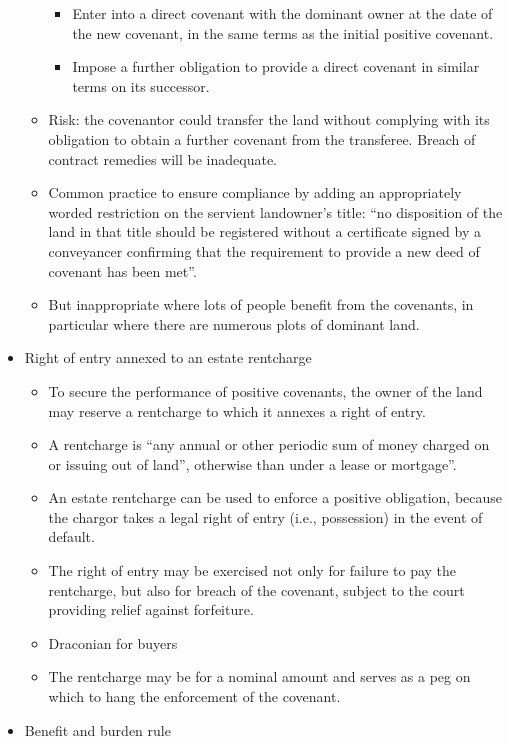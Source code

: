 \documentclass[
]{article}
\providecommand{\tightlist}{%
  \setlength{\itemsep}{0pt}\setlength{\parskip}{0pt}}
\begin{document}
\begin{itemize}
\begin{itemize}
    \begin{itemize}
    \tightlist
    \item
      Enter into a direct covenant with the dominant owner at the date
      of the new covenant, in the same terms as the initial positive
      covenant.
    \item
      Impose a further obligation to provide a direct covenant in
      similar terms on its successor.
    \end{itemize}
  \item
    Risk: the covenantor could transfer the land without complying with
    its obligation to obtain a further covenant from the transferee.
    Breach of contract remedies will be inadequate.
  \item
    Common practice to ensure compliance by adding an appropriately
    worded restriction on the servient landowner's title: ``no
    disposition of the land in that title should be registered without a
    certificate signed by a conveyancer confirming that the requirement
    to provide a new deed of covenant has been met''.
  \item
    But inappropriate where lots of people benefit from the covenants,
    in particular where there are numerous plots of dominant land.
  \end{itemize}
\item
  Right of entry annexed to an estate rentcharge

  \begin{itemize}
  \tightlist
  \item
    To secure the performance of positive covenants, the owner of the
    land may reserve a rentcharge to which it annexes a right of entry.
  \item
    A rentcharge is ``any annual or other periodic sum of money charged
    on or issuing out of land'', otherwise than under a lease or
    mortgage''.
  \item
    An estate rentcharge can be used to enforce a positive obligation,
    because the chargor takes a legal right of entry (i.e., possession)
    in the event of default.
  \item
    The right of entry may be exercised not only for failure to pay the
    rentcharge, but also for breach of the covenant, subject to the
    court providing relief against forfeiture.
  \item
    Draconian for buyers
  \item
    The rentcharge may be for a nominal amount and serves as a peg on
    which to hang the enforcement of the covenant.
  \end{itemize}
\item
  Benefit and burden rule


\end{itemize}
\end{document}
